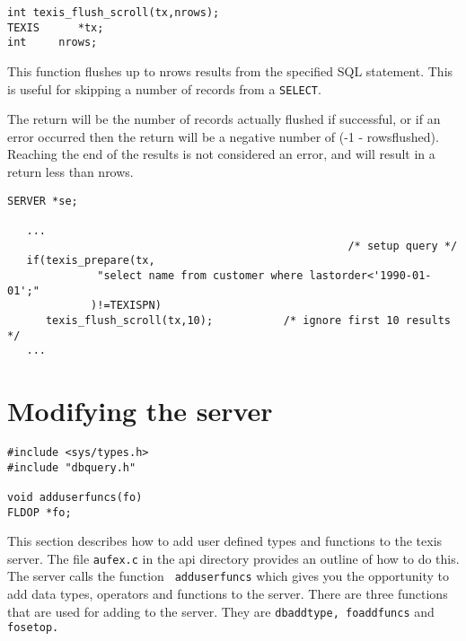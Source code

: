 
\SYNOPSIS
\begin{verbatim}
int texis_flush_scroll(tx,nrows);
TEXIS      *tx;
int     nrows;
\end{verbatim}

\DESCRIPTION

This function flushes up to nrows results from the specified SQL
statement. This is useful for skipping a number of records from
a \verb`SELECT`.

The return will be the number of records actually flushed if
successful, or if an error occurred then the return will be a
negative number of (-1 - rowsflushed).  Reaching the end of the
results is not considered an error, and will result in a return
less than nrows.

\EXAMPLE
\begin{verbatim}
SERVER *se;

   ...
                                                     /* setup query */
   if(texis_prepare(tx,
              "select name from customer where lastorder<'1990-01-01';"
             )!=TEXISPN)
      texis_flush_scroll(tx,10);           /* ignore first 10 results */
   ...
\end{verbatim}



\newpage\section{Modifying the server}


\SYNOPSIS
\begin{verbatim}
#include <sys/types.h>
#include "dbquery.h"

void adduserfuncs(fo)
FLDOP *fo;
\end{verbatim}

\DESCRIPTION

This section describes how to add user defined types and functions to the
texis server. The file {\tt aufex.c} in the api directory provides an
outline of how to do this.  The server calls the function {\tt
adduserfuncs} which gives you the opportunity to add data types, operators
and functions to the server.  There are three functions that are used for
adding to the server. They are {\tt dbaddtype, foaddfuncs} and {\tt
fosetop.}

